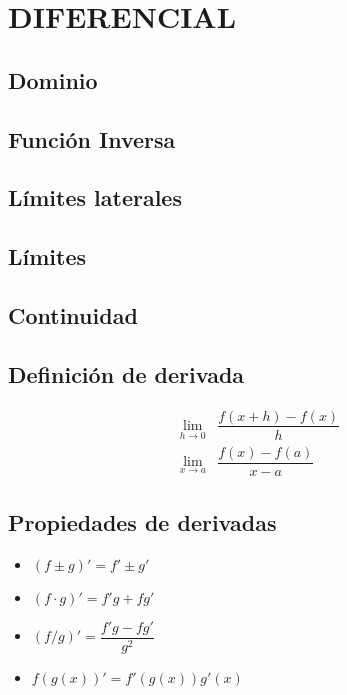 \section{DIFERENCIAL}

\subsection{Dominio}

\subsection{Función Inversa}

\subsection{Límites laterales}

\subsection{Límites}

\subsection{Continuidad}

\subsection{Definición de derivada}

\begin{align*}
	\lim\limits_{h \to 0}& \dfrac{f(x+h)-f(x)}{h}\\
	\lim\limits_{x \to a}& \dfrac{f(x)-f(a)}{x-a}
\end{align*}

\subsection{Propiedades de derivadas}
\begin{itemize}
	\item $(f\pm g)'=f'\pm g'$
	\item $(f\cdot g)'=f'g+fg'$
	\item $(f/g)'=\dfrac{f'g-fg'}{g^2}$
	\item $f(g(x))'=f'(g(x))g'(x)$
\end{itemize}

